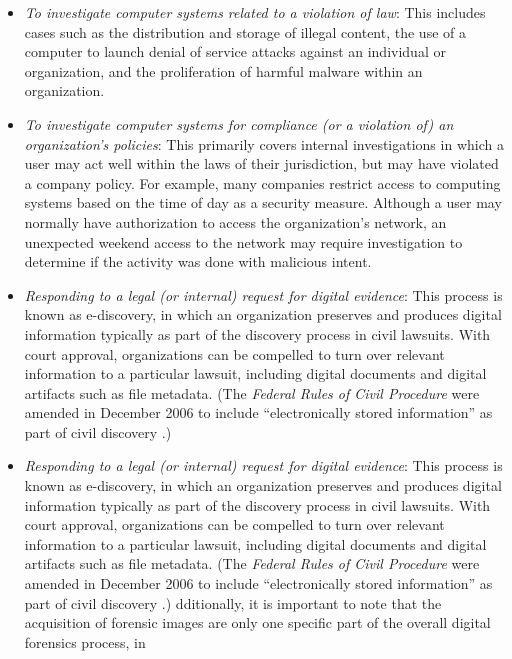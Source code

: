 \begin{itemize}
\item
  \emph{To investigate computer systems related to a violation of law}:
  This includes cases such as the distribution and storage of illegal
  content, the use of a computer to launch denial of service attacks
  against an individual or organization, and the proliferation of
  harmful malware within an organization.
\item
  \emph{To investigate computer systems for compliance (or a violation
  of) an organization's policies}: This primarily covers internal
  investigations in which a user may act well within the laws of their
  jurisdiction, but may have violated a company policy. For example,
  many companies restrict access to computing systems based on the time
  of day as a security measure. Although a user may normally have
  authorization to access the organization's network, an unexpected
  weekend access to the network may require investigation to determine
  if the activity was done with malicious intent.
\item
  \emph{Responding to a legal (or internal) request for digital
  evidence}: This process is known as e-discovery, in which an
  organization preserves and produces digital information typically as
  part of the discovery process in civil lawsuits. With court approval,
  organizations can be compelled to turn over relevant information to a
  particular lawsuit, including digital documents and digital artifacts
  such as file metadata. (The \emph{Federal Rules of Civil Procedure}
  were amended in December 2006 to include ``electronically stored
  information'' as part of civil discovery
  \cite{withersj.ElectronicallyStoredInformation2006}.)
\item
  \emph{Responding to a legal (or internal) request for digital
  evidence}: This process is known as e-discovery, in which an
  organization preserves and produces digital information typically as
  part of the discovery process in civil lawsuits. With court approval,
  organizations can be compelled to turn over relevant information to a
  particular lawsuit, including digital documents and digital artifacts
  such as file metadata. (The \emph{Federal Rules of Civil Procedure}
  were amended in December 2006 to include ``electronically stored
  information'' as part of civil discovery
  \cite{withersj.ElectronicallyStoredInformation2006}.) dditionally,
  it is important to note that the acquisition of forensic images are
  only one specific part of the overall digital forensics process, in

\end{itemize}

